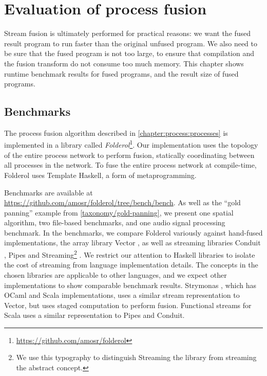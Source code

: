 \chapter{Evaluation of process fusion}
\label{s:Benchmarks}
Stream fusion is ultimately performed for practical reasons: we want the fused result program to run faster than the original unfused program.
We also need to be sure that the fused program is not too large, to ensure that compilation and the fusion transform do not consume too much memory.
This chapter shows runtime benchmark results for fused programs, and the result size of fused programs.

\section{Benchmarks}

The process fusion algorithm described in \cref{chapter:process:processes} is implemented in a library called \emph{Folderol}\footnote{\url{https://github.com/amosr/folderol}}.
Our implementation uses the topology of the entire process network to perform fusion, statically coordinating between all processes in the network.
To fuse the entire process network at compile-time, Folderol uses Template Haskell, a form of metaprogramming.

\newcommand\Streaming[0] {{\sc Streaming}\xspace}
Benchmarks are available at \url{https://github.com/amosr/folderol/tree/bench/bench}.
As well as the ``gold panning'' example from \cref{taxonomy/gold-panning}, we present one spatial algorithm, two file-based benchmarks, and one audio signal processing benchmark.
In the benchmarks, we compare Folderol variously against hand-fused implementations, the array library Vector \cite{hackage:vector}, as well as streaming libraries Conduit \cite{hackage:conduit}, Pipes \cite{hackage:pipes} and \Streaming\footnote{We use this typography to distinguish \Streaming the library from streaming the abstract concept.} \cite{hackage:streaming}.
We restrict our attention to Haskell libraries to isolate the cost of streaming from language implementation details.
The concepts in the chosen libraries are applicable to other languages, and we expect other implementations to show comparable benchmark results.
Strymonas \citep{kiselyov2016stream}, which has OCaml and Scala implementations, uses a similar stream representation to Vector, but uses staged computation to perform fusion.
Functional streams for Scala \citep{package:scala:fs2} uses a similar representation to Pipes and Conduit.


